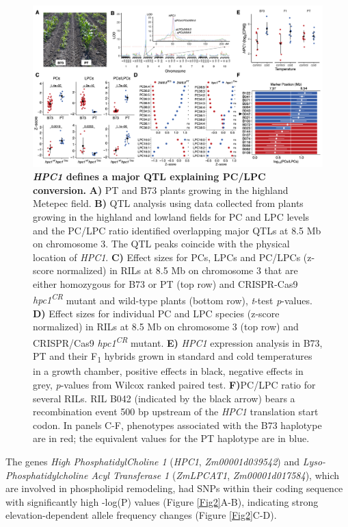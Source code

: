 \documentclass[9pt,twocolumn,twoside,lineno]{biorxiv}
\begin{document}
\begin{figure}[!ht]
\begin{center}
\includegraphics[width=0.8\paperwidth]{Figures/Fig_3.png}
\caption{\textbf{\textit{HPC1} defines a major QTL explaining PC/LPC conversion.} 
\textbf{A)} PT and B73 plants growing in the highland Metepec field. 
\textbf{B)} QTL analysis using data collected from plants growing in the highland and lowland fields for PC and LPC levels and the PC/LPC ratio identified overlapping major QTLs at 8.5 Mb on chromosome 3. 
The QTL peaks coincide with the physical location of \textit{HPC1}. 
\textbf{C)} Effect sizes for PCs, LPCs and PC/LPCs (z-score normalized) in RILs at 8.5 Mb on chromosome 3 that are either homozygous for B73 or PT (top row) and CRISPR-Cas9 \textit{hpc1\textsuperscript{CR}} mutant and wild-type plants (bottom row), \textit{t}-test \textit{p}-values.        
\textbf{D)} Effect sizes for individual PC and LPC species (z-score normalized) in RILs at 8.5 Mb on chromosome 3 (top row) and CRISPR/Cas9 \textit{hpc1\textsuperscript{CR}} mutant.
\textbf{E)} \textit{HPC1} expression analysis in B73, PT and their F\textsubscript{1} hybrids grown in standard and cold temperatures in a growth chamber, positive effects in black, negative effects in grey, \textit{p}-values from Wilcox ranked paired test.
\textbf{F)}PC/LPC ratio for several RILs. RIL B042 (indicated by the black arrow) bears a recombination event 500 bp upstream of the \textit{HPC1} translation start codon.
In panels C-F, phenotypes associated with the B73 haplotype are in red; the equivalent values for the PT haplotype are in blue.}
\label{Fig3}
\end{center}
\end{figure} 
The genes  \textit{High PhosphatidylCholine 1} (\textit{HPC1}, \textit{Zm00001d039542}) and \textit{Lyso-Phosphatidylcholine Acyl Transferase 1} (\textit{ZmLPCAT1}, \textit{Zm00001d017584}), which are involved in phospholipid remodeling, had SNPs within their coding sequence with significantly high -log(P) values (Figure \ref{Fig2}A-B), indicating strong elevation-dependent allele frequency changes (Figure \ref{Fig2}C-D). 
\end{document}

